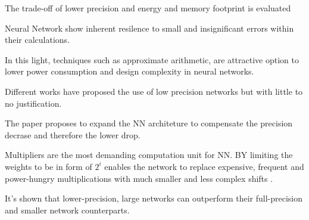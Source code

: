The trade-off of lower precision and energy and memory footprint is evaluated

Neural Network show inherent resilence to small and insignificant errors within their calculations.

In this light, techniques such as approximate arithmetic, are attractive option to lower power consumption and design complexity in neural networks.

Different works have proposed the use of low precision networks but with little to no justification.

The paper proposes to expand the NN architeture to compensate the precision decrase and therefore the lower drop.

Multipliers are the most demanding computation unit for NN. BY limiting the weights to be in form of $2^{i}$ enables the network to replace expensive, frequent and power-hungry multiplications with much smaller and less complex shifts \cite{lin2016neuralnetworksmultiplications}. 

It's shown that lower-precision, large networks can outperform their full-precision and smaller network counterparts. 